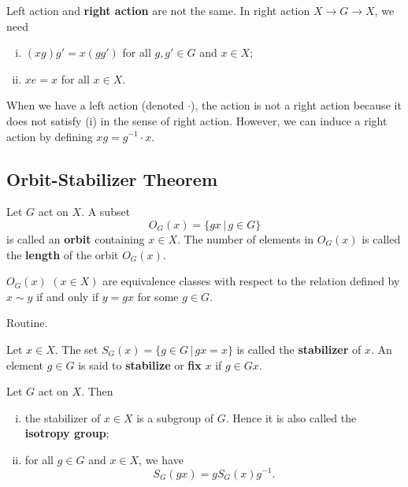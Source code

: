 \begin{remark}
\begin{remark}
Left action and \textbf{right action} are not the same. In right action $X\rightarrow G\rightarrow X$, we need 
	\begin{enumerate}[(i)]
		\item $(xg)g' = x(gg')$ for all  $g,g'\in G$ and $x\in X$;
		\item $xe =x$ for all $x\in X$.
	\end{enumerate}
	When we have a left action (denoted $\cdot$),  the action is not a right action because it does not satisfy (i) in the sense of right action. However, we can induce a right action by defining $xg = g^{-1}\cdot x$.
	\end{remark}

\subsection{Orbit-Stabilizer Theorem}
\begin{definition}
	Let $G$ act on $X$. A subset \begin{equation*}
		O_G(x) = \{gx\,|\, g\in G\}
	\end{equation*}
	is called an \textbf{orbit} containing $x\in X$. The number of elements in $O_G(x)$ is called the \textbf{length} of the orbit $O_G(x)$. 
\end{definition}
\begin{proposition} \label{prop-orbits-are-eqv-classes}
	$O_G(x)$ $(x\in X)$ are equivalence classes with respect to the relation defined by $x\sim y$ if and only if $y=gx$ for some $g\in G$.
\end{proposition}
\begin{sketch}
	Routine.
\end{sketch}
\begin{definition}
	Let $x\in X$. The set $S_G(x) = \{g\in G\,|\, gx = x\}$ is called the \textbf{stabilizer} of $x$. An element $g\in G$ is said to \textbf{stabilize} or \textbf{fix} $x$ if $g\in Gx$.
\end{definition}
\begin{proposition}  \label{prop-stabilizer}
	Let $G$ act on $X$. Then
	\begin{enumerate}[(i)]
		\item the stabilizer of $x\in X$ is a subgroup of $G$. Hence it is also called the \textbf{isotropy group};
		\item for all $g\in G$ and $x\in X$, we have
		\begin{equation*}
			S_G(gx) = gS_G(x)g^{-1}.

\end{equation*}
\end{enumerate}
\end{proposition}
\end{remark}
